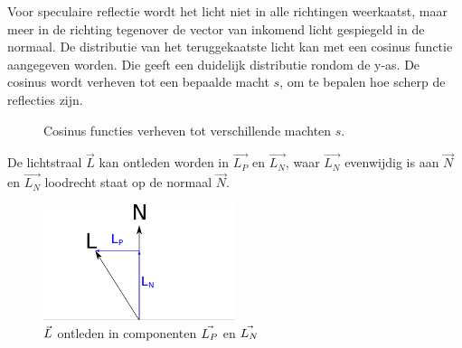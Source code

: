 \documentclass[12pt, a4paper]{article}
\begin{document}
Voor speculaire reflectie wordt het licht niet in alle richtingen weerkaatst, maar meer in de richting tegenover de vector van inkomend licht gespiegeld in de normaal. De distributie van het teruggekaatste licht kan met een cosinus functie aangegeven worden. Die geeft een duidelijk distributie rondom de y-as. De cosinus wordt verheven tot een bepaalde macht $s$, om te bepalen hoe scherp de reflecties zijn.

\begin{figure}[H]
    \centering
    \caption{Cosinus functies verheven tot verschillende machten $s$.}
    \label{fig:cosini}
\end{figure}

De lichtstraal $\vec{L}$ kan ontleden worden in $\vec{L_P}$ en $\vec{L_N}$, waar $\vec{L_N}$ evenwijdig is aan $\vec{N}$ en $\vec{L_N}$ loodrecht staat op de normaal $\vec{N}$.

\begin{figure}[H]
    \centering
    \includegraphics[width=0.50\textwidth]{L_decomposition.png}
    \caption{$\protect\vec{L}$ ontleden in componenten $\protect\vec{L_P}$ en $\protect\vec{L_N}$}
    \label{fig:L_decomposition}
\end{figure}
\end{document}
